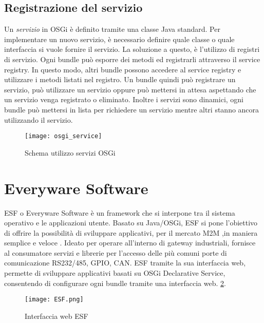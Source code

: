 \subsection{Registrazione del servizio}
Un \emph{servizio} in OSGi è definito tramite una classe Java standard. Per
implementare un nuovo servizio, è necessario definire quale classe o quale
interfaccia si vuole fornire il servizio.
La soluzione a questo, è l'utilizzo di registri di servizio. Ogni bundle può
esporre dei metodi ed registrarli attraverso il service registry. In questo
modo, altri bundle possono accedere al service registry e utilizzare i metodi
listati nel registro. Un bundle quindi può registrare un servizio, può
utilizzare un servizio oppure può mettersi in attesa aspettando che un servizio
venga registrato o eliminato.
Inoltre i servizi sono dinamici, ogni bundle può mettersi in lista per
richiedere un servizio mentre altri stanno ancora utilizzando il servizio.
\begin{figure}[h]
        \centering 
                \texttt{[image: osgi\_service]}
        \caption{Schema utilizzo servizi OSGi}
        \label{}
\end{figure}

\section{Everyware Software}
ESF o Everyware Software è un framework che si interpone tra il sistema operativo
e le applicazioni utente. Basato su Java/OSGi, ESF si pone l'obiettivo di
offrire  la possibilità di sviluppare applicativi, per il mercato M2M ,in maniera semplice e veloce
. Ideato per operare all'interno di gateway
industriali, fornisce al consumatore servizi e librerie per l'accesso delle più
comuni porte di comunicazione RS232/485, GPIO, CAN.
ESF tramite la sua interfaccia web, permette di 
sviluppare applicativi basati su OSGi Declarative Service, consentendo di configurare
ogni bundle tramite una interfaccia web.
\ref{fig:ESF_web}.


\begin{figure}[h]
        \centering 
                \texttt{[image: ESF.png]}
                \caption{Interfaccia web ESF}
        \label{fig:ESF_web}
\end{figure}

